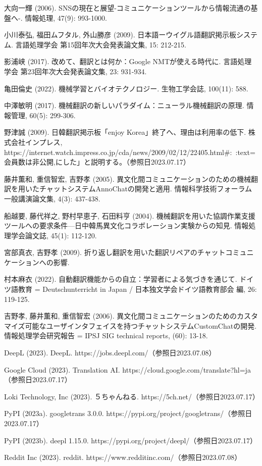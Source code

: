 \documentclass[b5paper,12pt]{jsreport}
\begin{document}
\begin{thebibliography}{99}

大向一輝 (2006). SNSの現在と展望-コミュニケーションツールから情報流通の基盤へ-. 情報処理, 47(9): 993-1000.

小川泰弘, 福田ムフタル, 外山勝彦 (2009). 日本語ーウイグル語翻訳掲示板システム. 言語処理学会 第15回年次大会発表論文集, 15: 212-215.

影浦峡 (2017). 改めて、翻訳とは何か：Google NMTが使える時代に. 言語処理学会 第23回年次大会発表論文集, 23: 931-934.

亀田倫史 (2022). 機械学習とバイオテクノロジー. 生物工学会誌, 100(11): 588.

中澤敏明 (2017). 機械翻訳の新しいパラダイム：ニューラル機械翻訳の原理. 情報管理, 60(5): 299-306.

野津誠 (2009). 日韓翻訳掲示板「enjoy Korea」終了へ、理由は利用率の低下. 株式会社インプレス, https://internet.watch.impress.co.jp/cda/news/2009/02/12/22405.html\#:~:text=会員数は非公開,にした」と説明する。（参照日2023.07.17）

藤井薫和, 重信智宏, 吉野孝 (2005). 異文化間コミュニケーションのための機械翻訳を用いたチャットシステムAnnoChatの開発と適用. 情報科学技術フォーラム一般講演論文集, 4(3): 437-438.

船越要, 藤代祥之, 野村早恵子, 石田料亨 (2004). 機械翻訳を用いた協調作業支援ツールへの要求条件—日中韓馬異文化コラボレーション実験からの知見. 情報処理学会論文誌, 45(1): 112-120.

宮部真衣, 吉野孝 (2009). 折り返し翻訳を用いた翻訳リペアのチャットコミュニケーションへの影響.

村本麻衣 (2022). 自動翻訳機能からの自立：学習者による気づきを通じて. ドイツ語教育 = Deutschunterricht in Japan / 日本独文学会ドイツ語教育部会 編, 26: 119-125.

吉野孝, 藤井薫和, 重信智宏 (2006). 異文化間コミュニケーションのためのカスタマイズ可能なユーザインタフェイスを持つチャットシステムCustomChatの開発. 情報処理学会研究報告 = IPSJ SIG technical reports, (60): 13-18.

DeepL (2023). DeepL. https://jobs.deepl.com/（参照日2023.07.08）

Google Cloud (2023). Translation AI. https://cloud.google.com/translate?hl=ja（参照日2023.07.17）

Loki Technology, Inc (2023). ５ちゃんねる. https://5ch.net/（参照日2023.07.17）

PyPI (2023a). googletrans 3.0.0. https://pypi.org/project/googletrans/（参照日2023.07.17）

PyPI (2023b). deepl 1.15.0. https://pypi.org/project/deepl/（参照日2023.07.17）

Reddit Inc (2023). reddit. https://www.redditinc.com/（参照日2023.07.08）

\end{thebibliography}
    
\end{document}
